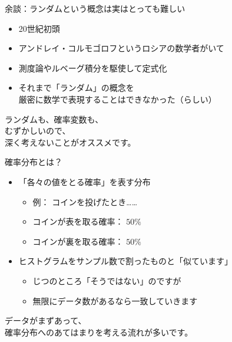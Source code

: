 \documentclass[dvipdfmx,cjk]{beamer}
\begin{document}
\begin{frame}{余談：ランダムという概念は実はとっても難しい}


\begin{itemize}
    \item 20世紀初頭
    \item アンドレイ・コルモゴロフというロシアの数学者がいて
    \item 測度論やルベーグ積分を駆使して定式化
    \item それまで「ランダム」の概念を\\厳密に数学で表現することはできなかった（らしい）
\end{itemize}

\vskip 1cm

ランダムも、確率変数も、\\
むずかしいので、\\
深く考えないことがオススメです。


\end{frame}


\begin{frame}{確率分布とは？}

\begin{itemize}

    \item 「各々の値をとる確率」を表す分布
        \begin{itemize}
        \item 例： コインを投げたとき……
        \item コインが表を取る確率： $50\%$
        \item コインが裏を取る確率： $50\%$
        \end{itemize}

    \item ヒストグラムをサンプル数で割ったものと「似ています」
        \begin{itemize}
        \item じつのところ「そうではない」のですが
        \item 無限にデータ数があるなら一致していきます
        \end{itemize}

\end{itemize}

\vskip 1cm

データがまずあって、\\
確率分布へのあてはまりを考える流れが多いです。

\end{frame}
\end{document}

